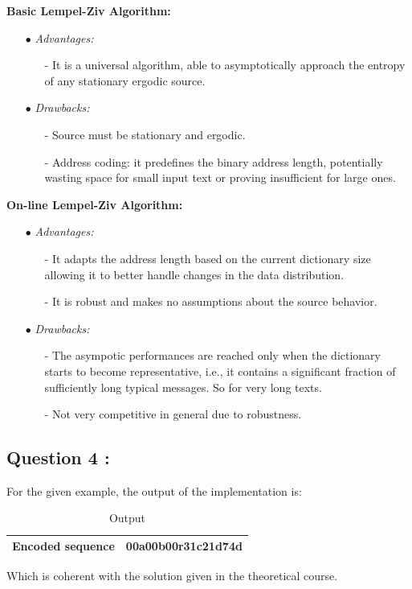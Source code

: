 \documentclass[titlepage]{article}
\begin{document}
\textbf{Basic Lempel-Ziv Algorithm:}
\begin{itemize}
    \item[$\bullet$] \textit{Advantages:}
    \begin{itemize}
        \item[-] It is a universal algorithm, able to asymptotically approach the entropy of any stationary ergodic source.
    \end{itemize}
    \item[$\bullet$] \textit{Drawbacks:}
    \begin{itemize}
        \item[-] Source must be stationary and ergodic.
        \item[-] Address coding: it predefines the binary address length, potentially wasting space for small input text or proving insufficient for large ones.
    \end{itemize}
\end{itemize}
\textbf{On-line Lempel-Ziv Algorithm:}
\begin{itemize}
    \item[$\bullet$] \textit{Advantages:}
    \begin{itemize}
        \item[-] It adapts the address length based on the current dictionary size allowing it to better handle changes in the data distribution.
        \item[-] It is robust and makes no assumptions about the source behavior.
    \end{itemize}
    \item[$\bullet$] \textit{Drawbacks:}
    \begin{itemize}
        \item[-] The asympotic performances are reached only when the dictionary starts to become representative, i.e., it contains a significant fraction of sufficiently long typical messages. So for very long texts.
        \item[-] Not very competitive in general due to robustness.
    \end{itemize}
\end{itemize}

\subsection{Question 4 : }

For the given example, the output of the implementation is:

\begin{table}[h!]
    \centering
    \small
    \setlength{\tabcolsep}{4pt}
    \begin{tabular}{|p{3.5cm}|p{3.5cm}|}
        \hline 
        \textbf{Encoded sequence} & 00a00b00r31c21d74d  \\
        \hline
    \end{tabular}
    \caption{Output}
    \label{tab:q4}
\end{table}
Which is coherent with the solution given in the theoretical course.
\end{document}
